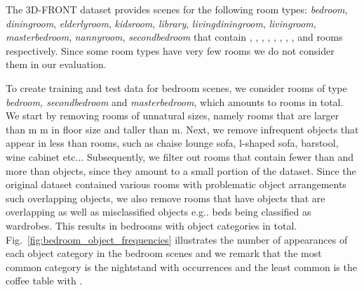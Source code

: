 \documentclass{article}
\makeatletter
\DeclareRobustCommand\onedot{\futurelet\@let@token\@onedot}
\def\@onedot{\ifx\@let@token.\else.\null\fi\xspace}
\def\eg{e.g\onedot} \def\Eg{E.g\onedot}
\def\etc{etc\onedot}
\newcommand{\boldparagraph}[1]{\vspace{0.2cm}\noindent{\bf #1:} }
\newcommand{\figref}[1]{Fig.~\ref{#1}}
\makeatother
\begin{document}
The 3D-FRONT dataset provides scenes for the following room types: \emph{bedroom},
\emph{diningroom}, \emph{elderlyroom}, \emph{kidsroom}, \emph{library},
\emph{livingdiningroom}, \emph{livingroom}, \emph{masterbedroom},
\emph{nannyroom}, \emph{secondbedroom} that contain , , ,
, , , , ,  and  rooms respectively. Since
some room types have very few rooms we do not consider them in our evaluation.

\boldparagraph{Bedroom}To create training and test data for bedroom scenes, we consider rooms of type
\emph{bedroom, secondbedroom} and \emph{masterbedroom}, which amounts to 
rooms in total. We start by removing rooms of unnatural sizes, namely rooms
that are larger than m  m in floor size and taller than m.
Next, we remove infrequent objects that appear in less than  rooms, such as
chaise lounge sofa, l-shaped sofa, barstool, wine cabinet \etc.  Subsequently,
we filter out rooms that contain fewer than  and more than  objects,
since they amount to a small portion of the dataset.  Since the original
dataset contained various rooms with problematic object arrangements such
overlapping objects, we also remove rooms that have objects that are
overlapping as well as misclassified objects \eg beds being classified as
wardrobes. This results in  bedrooms with  object categories in
total. \figref{fig:bedroom_object_frequencies} illustrates the
number of appearances of each object category in the  bedroom scenes and
we remark that the most common category is the nightstand with 
occurrences and the least common is the coffee table with .
\end{document}
